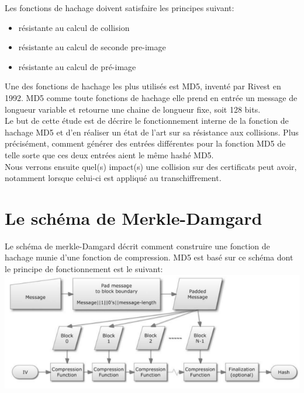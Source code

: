 \documentclass[a4paper,11pt,french]{article}
\begin{document}
Les fonctions de hachage doivent satisfaire les principes suivant:
\begin{itemize}
  \item résistante au calcul de collision
  \item résistante au calcul de seconde pre-image
  \item résistante au calcul de pré-image
\end{itemize}
\vspace{.5cm}

Une des fonctions de hachage les plus utilisés est MD5, inventé par Rivest en 1992. MD5 comme toute fonctions de hachage elle prend en entrée un message de longueur variable et retourne une chaine de longueur fixe, soit 128 bits.\\

Le but de cette étude est de décrire le fonctionnement interne de la fonction de hachage MD5 et d'en réaliser un état de l'art sur sa résistance aux collisions. Plus précisément, comment générer des entrées différentes pour la fonction MD5 de telle sorte que ces deux entrées aient le même hashé MD5.\\
Nous verrons ensuite quel(s) impact(s) une collision sur des certificats peut avoir, notamment lorsque celui-ci est appliqué au transchiffrement.

\section{Le schéma de Merkle-Damgard}
Le schéma de merkle-Damgard décrit comment construire une fonction de hachage munie d'une fonction de compression. MD5 est basé sur ce schéma dont le principe de fonctionnement est le suivant:\\

\includegraphics[scale=.61]{./pics/md.png}
\vspace{.5cm}
\end{document}
